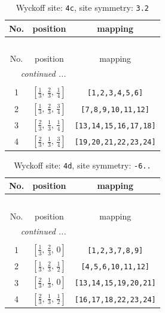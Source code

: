 \documentclass[fleqn,8pt]{jsarticle}
\begin{document}
\renewcommand{\arraystretch}{1.2}
\begin{longtable}{ccc}
\caption{Wyckoff site: {\tt 4c}, site symmetry: {\tt 3.2}}
 \\
 \hline \hline
No. & position & mapping \\ \hline \endfirsthead

\multicolumn{2}{l}{\tablename\ \thetable{}} \\
 \hline \hline
No. & position & mapping \\ \hline \endhead

 \hline \hline
\multicolumn{2}{r}{\footnotesize\it continued ...} \\ \endfoot

 \hline \hline
\multicolumn{2}{r}{} \\ \endlastfoot

1 & $\left[ \frac{1}{3},\, \frac{2}{3},\, \frac{1}{4} \right]$ & {\tt [1,2,3,4,5,6]} \\ \hline
2 & $\left[ \frac{1}{3},\, \frac{2}{3},\, \frac{3}{4} \right]$ & {\tt [7,8,9,10,11,12]} \\ \hline
3 & $\left[ \frac{2}{3},\, \frac{1}{3},\, \frac{1}{4} \right]$ & {\tt [13,14,15,16,17,18]} \\ \hline
4 & $\left[ \frac{2}{3},\, \frac{1}{3},\, \frac{3}{4} \right]$ & {\tt [19,20,21,22,23,24]} \\
\end{longtable}
\renewcommand{\arraystretch}{1.2}
\begin{longtable}{ccc}
\caption{Wyckoff site: {\tt 4d}, site symmetry: {\tt -6..}}
 \\
 \hline \hline
No. & position & mapping \\ \hline \endfirsthead

\multicolumn{2}{l}{\tablename\ \thetable{}} \\
 \hline \hline
No. & position & mapping \\ \hline \endhead

 \hline \hline
\multicolumn{2}{r}{\footnotesize\it continued ...} \\ \endfoot

 \hline \hline
\multicolumn{2}{r}{} \\ \endlastfoot

1 & $\left[ \frac{1}{3},\, \frac{2}{3},\, 0 \right]$ & {\tt [1,2,3,7,8,9]} \\ \hline
2 & $\left[ \frac{1}{3},\, \frac{2}{3},\, \frac{1}{2} \right]$ & {\tt [4,5,6,10,11,12]} \\ \hline
3 & $\left[ \frac{2}{3},\, \frac{1}{3},\, 0 \right]$ & {\tt [13,14,15,19,20,21]} \\ \hline
4 & $\left[ \frac{2}{3},\, \frac{1}{3},\, \frac{1}{2} \right]$ & {\tt [16,17,18,22,23,24]} \\
\end{longtable}
\end{document}
